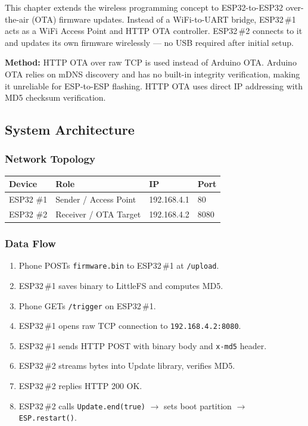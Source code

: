 \documentclass[11pt, a4paper]{article}
\begin{document}
This chapter extends the wireless programming concept to ESP32-to-ESP32
over-the-air (OTA) firmware updates. Instead of a WiFi-to-UART bridge, ESP32\,\#1
acts as a WiFi Access Point and HTTP OTA controller. ESP32\,\#2 connects to it
and updates its own firmware wirelessly --- no USB required after initial setup.

\textbf{Method:} HTTP OTA over raw TCP is used instead of Arduino OTA. Arduino OTA
relies on mDNS discovery and has no built-in integrity verification, making it
unreliable for ESP-to-ESP flashing. HTTP OTA uses direct IP addressing with MD5
checksum verification.

\subsection{System Architecture}

\subsubsection{Network Topology}

\begin{center}
\begin{tabular}{@{} l l l l @{}}
\toprule
\textbf{Device} & \textbf{Role} & \textbf{IP} & \textbf{Port} \\
\midrule
ESP32 \#1 & Sender / Access Point & 192.168.4.1 & 80 \\
ESP32 \#2 & Receiver / OTA Target & 192.168.4.2 & 8080 \\
\bottomrule
\end{tabular}
\end{center}

\subsubsection{Data Flow}

\begin{enumerate}
  \item Phone POSTs \texttt{firmware.bin} to ESP32\,\#1 at \texttt{/upload}.
  \item ESP32\,\#1 saves binary to LittleFS and computes MD5.
  \item Phone GETs \texttt{/trigger} on ESP32\,\#1.
  \item ESP32\,\#1 opens raw TCP connection to \texttt{192.168.4.2:8080}.
  \item ESP32\,\#1 sends HTTP POST with binary body and \texttt{x-md5} header.
  \item ESP32\,\#2 streams bytes into Update library, verifies MD5.
  \item ESP32\,\#2 replies HTTP 200 OK.
  \item ESP32\,\#2 calls \texttt{Update.end(true)} $\rightarrow$ sets boot
        partition $\rightarrow$ \texttt{ESP.restart()}.
\end{enumerate}
\end{document}
